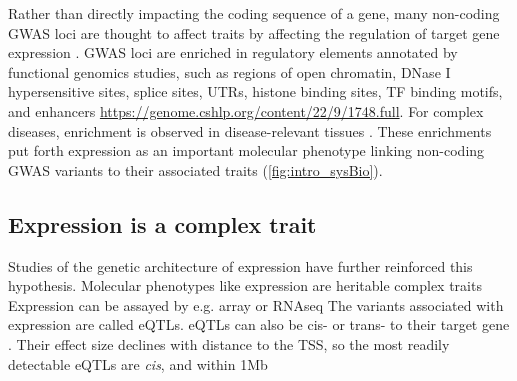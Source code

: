 \begin{outline}
\1 Rather than directly impacting the coding sequence of a gene, 
many non-coding GWAS loci are thought to affect traits by affecting the regulation of target gene expression \autocite{gallagher2018PostGWASEraAssociation}.
\gls{GWAS} loci are enriched in regulatory elements annotated by functional genomics studies, such as
    regions of open chromatin, 
    DNase I hypersensitive sites,
    splice sites, UTRs,
    histone binding sites, 
    \gls{TF} binding motifs,
    and enhancers \autocite{trynka2015DisentanglingEffectsColocalizing,gallagher2018PostGWASEraAssociation} \url{https://genome.cshlp.org/content/22/9/1748.full}.
\2 For complex diseases, enrichment is observed in disease-relevant tissues \autocite{visscher201710YearsGWAS}.
\2 These enrichments put forth expression as an important molecular phenotype linking non-coding \gls{GWAS} variants to their associated traits (\autoref{fig:intro_sysBio}).

\subsection{Expression is a complex trait}

\1 Studies of the genetic architecture of expression have further reinforced this hypothesis.
    \2 Molecular phenotypes like expression are heritable complex traits \autocite{gaffney2013GlobalPropertiesFunctional}
    \2 Expression can be assayed by e.g. array or RNAseq
    \2 The variants associated with expression are called \glspl{eQTL}.
    \2 eQTLs can also be cis- or trans- to their target gene \autocite{albert2015RoleRegulatoryVariation}.
    \2 Their effect size declines with distance to the TSS, so the most readily detectable eQTLs are \textit{cis}, and within 1Mb \autocite{vandiedonck2017GeneticAssociationMolecular}


\end{outline}

